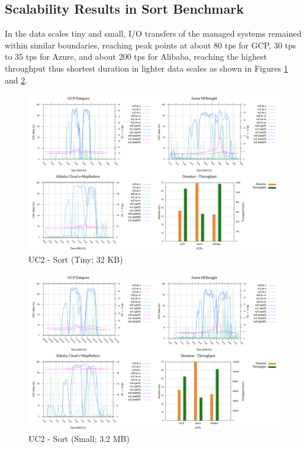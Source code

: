 \documentclass[review]{elsarticle}
\begin{document}
	
	\subsection{Scalability Results in Sort Benchmark}
	In the data scales tiny and small, I/O transfers of the managed systems remained within similar boundaries, reaching peak points at about 80 tps for GCP, 30 tps to 35 tps for Azure, and about 200 tps for Alibaba, reaching the highest throughput thus shortest duration in lighter data scales as shown in Figures \ref{fig:uc2-srt-t-cmidt} and \ref{fig:uc2-srt-s-cmidt}. 
	
	\begin{figure}[p]
		\caption{UC2 - Sort (Tiny; 32 KB)}
		\label{fig:uc2-srt-t-cmidt}
		\includegraphics[width=\textwidth]{uc2-srt-t-cmidt}
		\centering
	\end{figure}
	
	\begin{figure}[p]
		\caption{UC2 - Sort (Small; 3.2 MB)}
		\label{fig:uc2-srt-s-cmidt}
		\includegraphics[width=\textwidth]{uc2-srt-s-cmidt}
		\centering
	\end{figure}
	
\end{document}
